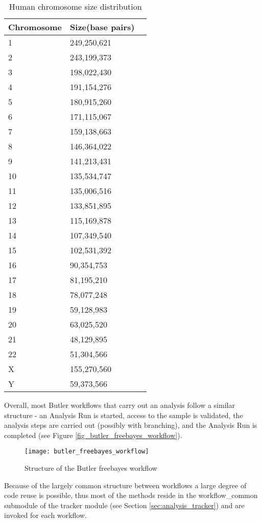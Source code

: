 \begin{table}[H]
\label{tab:chromosome_sizes}
\renewcommand{\arraystretch}{1.2} 
\centering
\begin{tabular}{@{}lll@{}}
\toprule
Chromosome & Size(base pairs)\\
\midrule
1 & 249,250,621\\
2 & 243,199,373\\
3 & 198,022,430\\
4 & 191,154,276\\
5 & 180,915,260\\
6 & 171,115,067\\
7 & 159,138,663\\
8 & 146,364,022\\
9 & 141,213,431\\
10 & 135,534,747\\
11 & 135,006,516\\
12 & 133,851,895\\
13 & 115,169,878\\
14 & 107,349,540\\
15 & 102,531,392\\
16 & 90,354,753\\
17 & 81,195,210\\
18 & 78,077,248\\
19 & 59,128,983\\
20 & 63,025,520\\
21 & 48,129,895\\
22 & 51,304,566\\
X & 155,270,560\\
Y & 59,373,566\\
\bottomrule
\end{tabular}
\caption{Human chromosome size distribution}
\end{table}

Overall, most Butler workflows that carry out an analysis follow a similar structure - an Analysis Run is started, access to the sample is validated, the analysis steps are carried out (possibly with branching), and the Analysis Run is completed (see Figure \ref{fig_butler_freebayes_workflow}).

\begin{figure}[H]
\texttt{[image: butler\_freebayes\_workflow]}
\centering
\caption {Structure of the Butler freebayes workflow}
\label{fig:butler_freebayes_workflow}
\end{figure}

Because of the largely common structure between workflows a large degree of code reuse is possible, thus most of the methods reside in the workflow\_common submodule of the tracker module (see Section \ref{sec:analysis_tracker}) and are invoked for each workflow.

